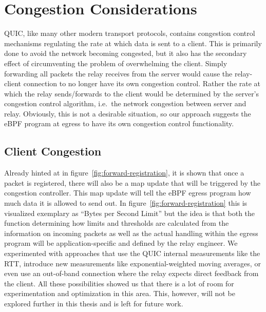 \section{Congestion Considerations}\label{sec:congestion_considerations}
QUIC, like many other modern transport protocols, contains congestion 
control mechanisms regulating the rate at which data is sent to a client.
This is primarily done to avoid the network becoming congested, but it also
has the secondary effect of circumventing the problem of overwhelming the client.
Simply forwarding all packets the relay receives from the server would cause 
the relay-client connection to no longer have its own congestion control.
Rather the rate at which the relay sends/forwards to the client would be determined
by the server's congestion control algorithm, i.e.~the network congestion between 
server and relay.
Obviously, this is not a desirable situation, so our approach suggests the eBPF 
program at egress to have its own congestion control functionality.

\subsection{Client Congestion}
Already hinted at in figure~\ref{fig:forward-registration}, it is shown that once a packet is 
registered, there will also be a map update that will be triggered by the congestion controller.
This map update will tell the eBPF egress program how much data it is allowed to send out. 
In figure~\ref{fig:forward-registration} this is visualized exemplary as ``Bytes per Second Limit''
but the idea is that both the function determining how limits and thresholds are calculated from 
the information on incoming packets as well as the actual handling within the egress program 
will be application-specific and defined by the relay engineer.
We experimented with approaches that use the QUIC internal measurements like the RTT, 
introduce new measurements like exponential-weighted moving averages, or even use an 
out-of-band connection where the relay expects direct feedback from the client.
All these possibilities showed us that there is a lot of room for experimentation and optimization
in this area.
This, however, will not be explored further in this thesis and is left for future work.
\\

